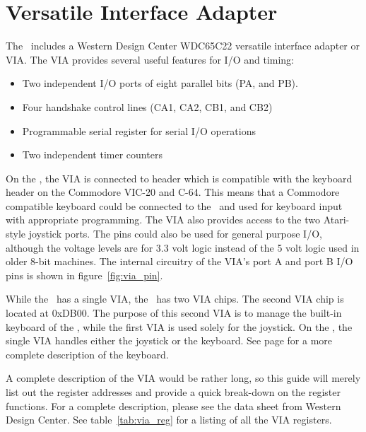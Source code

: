 \chapter{Versatile Interface Adapter}
\label{chap_via}

The \jr\ includes a Western Design Center WDC65C22 versatile interface adapter or VIA. The VIA provides several useful features for I/O and timing:

\begin{itemize}
    \item Two independent I/O ports of eight parallel bits (PA, and PB).

    \item Four handshake control lines (CA1, CA2, CB1, and CB2)

    \item Programmable serial register for serial I/O operations

    \item Two independent timer counters
\end{itemize}

On the \fjr, the VIA is connected to header which is compatible with the keyboard header on the Commodore VIC-20 and C-64. This means that a Commodore compatible keyboard could be connected to the \jr\ and used for keyboard input with appropriate programming. The VIA also provides access to the two Atari-style joystick ports. The pins could also be used for general purpose I/O, although the voltage levels are for 3.3 volt logic instead of the 5 volt logic used in older 8-bit machines. The internal circuitry of the VIA's port A and port B I/O pins is shown in figure~\ref{fig:via_pin}.

\begin{note}
    While the \fjr\ has a single VIA, the \fk\ has two VIA chips. The second VIA chip is located at 0xDB00. The purpose of this second VIA is to manage the built-in keyboard of the \fk, while the first VIA is used solely for the joystick. On the \fjr, the single VIA handles either the joystick or the keyboard. See page \pageref{sec_f256k_kbd} for a more complete description of the keyboard.
\end{note}

A complete description of the VIA would be rather long, so this guide will merely list out the register addresses and provide a quick break-down on the register functions. For a complete description, please see the data sheet from Western Design Center. See table~\ref{tab:via_reg} for a listing of all the VIA registers.

